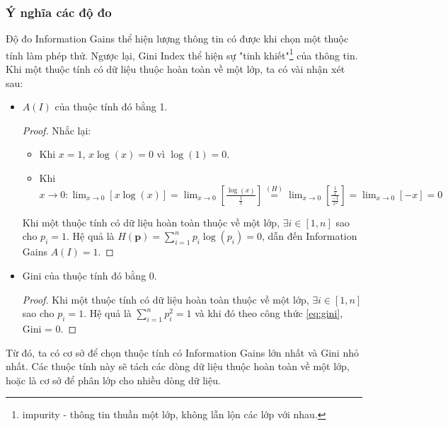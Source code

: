 \documentclass[12pt]{article}
\begin{document}
\subsubsection{Ý nghĩa các độ đo}
Độ đo Information Gains thể hiện lượng thông tin có được khi chọn một thuộc tính làm phép thử. Ngược lại, Gini Index thể hiện sự "tinh khiết"\footnote{impurity - thông tin thuần một lớp, không lẫn lộn các lớp với nhau.} của thông tin. Khi một thuộc tính có dữ liệu thuộc hoàn toàn về một lớp, ta có vài nhận xét sau:
\begin{itemize}
\item $A(I)$ của thuộc tính đó bằng 1.
\begin{proof}
Nhắc lại:
\begin{itemize}
\item Khi $x = 1$, $x\log(x) = 0$ vì $\log(1) = 0$.
\item Khi $x \rightarrow 0: 
\displaystyle
\lim_{x \rightarrow 0}\left[x\log(x)\right] = \lim_{x \rightarrow 0}\left[\frac{\log(x)}{\frac{1}{x}}\right] \overset{(H)}= \lim_{x \rightarrow 0} \left[\frac{\frac{1}{x}}{\frac{-1}{x^2}}\right] = \lim_{x \rightarrow 0} [-x] = 0
$

\end{itemize}
Khi một thuộc tính có dữ liệu hoàn toàn thuộc về một lớp, $\exists i \in [1, n]$ sao cho $p_i = 1$. Hệ quả là $\displaystyle H(\textbf{p}) = \sum_{i = 1}^n p_i\log(p_i) = 0$, dẫn đến Information Gains $A(I) = 1$.
\end{proof}
\item Gini của thuộc tính đó bằng 0.
\begin{proof}
Khi một thuộc tính có dữ liệu hoàn toàn thuộc về một lớp, $\exists i \in [1, n]$ sao cho $p_i = 1$. Hệ quả là $\displaystyle \sum_{i = 1}^{n} p_i^2 = 1$ và khi đó theo công thức \ref{eq:gini}, Gini = 0.
\end{proof}
\end{itemize}
Từ đó, ta có cơ sở để chọn thuộc tính có Information Gains lớn nhất và Gini nhỏ nhất. Các thuộc tính này sẽ tách các dòng dữ liệu thuộc hoàn toàn về một lớp, hoặc là cơ sở để phân lớp cho nhiều dòng dữ liệu.
\end{document}
